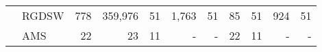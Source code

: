 \begin{table}[H]
\begin{tabular}{llrrrrrrrrr}
\cline{2-11}
\bfseries  & RGDSW & 778 & {\cellcolor[HTML]{FFFFE5}} \color[HTML]{000000} 359,976 & 51 & {\cellcolor[HTML]{BCE395}} \color[HTML]{000000} 1,763 & 51 & {\cellcolor[HTML]{379E54}} \color[HTML]{F1F1F1} 85 & 51 & {\cellcolor[HTML]{004529}} \color[HTML]{F1F1F1} 924 & 51 \\
\cline{2-11}
\bfseries  & AMS & 22 & {\cellcolor[HTML]{BCE395}} \color[HTML]{000000} 23 & 11 & {\cellcolor[HTML]{004529}} \color[HTML]{F1F1F1} {\cellcolor[HTML]{ADD8E6}} - & - & {\cellcolor[HTML]{379E54}} \color[HTML]{F1F1F1} 22 & 11 & {\cellcolor[HTML]{FFFFE5}} \color[HTML]{000000} {\cellcolor[HTML]{ADD8E6}} - & - \\
\cline{1-11} \cline{2-11}
\bottomrule
\end{tabular}
\end{table}
